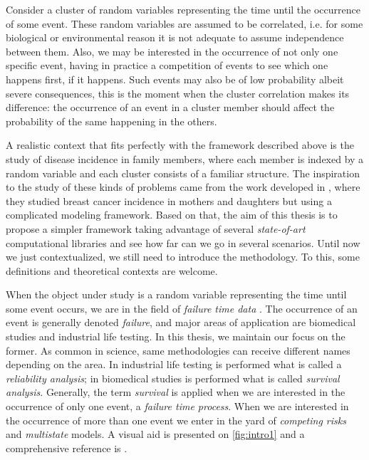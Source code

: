 Consider a cluster of random variables representing the time until the
occurrence of some event. These random variables are assumed to be
correlated, i.e. for some biological or environmental reason it is not
adequate to assume independence between them. Also, we may be interested
in the occurrence of not only one specific event, having in practice a
competition of events to see which one happens first, if it
happens. Such events may also be of low probability albeit severe
consequences, this is the moment when the cluster correlation makes its
difference: the occurrence of an event in a cluster member should affect
the probability of the same happening in the others.

A realistic context that fits perfectly with the framework described
above is the study of disease incidence in family members, where each
member is indexed by a random variable and each cluster consists of a
familiar structure. The inspiration to the study of these kinds of
problems came from the work developed in , where
they studied breast cancer incidence in mothers and daughters but using
a complicated modeling framework. Based on that, the aim of this thesis
is to propose a simpler framework taking advantage of
several \textit{state-of-art} computational libraries and see how far
can we go in several scenarios. Until now we just contextualized, we
still need to introduce the methodology. To this, some definitions and
theoretical contexts are welcome.

When the object under study is a random variable representing the time
until some event occurs, we are in the field of \textit{failure time
data} \cite{kalb&prentice}. The occurrence of an event is generally
denoted \textit{failure}, and major areas of application are biomedical
studies and industrial life testing. In this thesis, we maintain our
focus on the former. As common in science, same methodologies can
receive different names depending on the area. In industrial life
testing is performed what is called a \textit{reliability analysis}; in
biomedical studies is performed what is called
\textit{survival analysis}. Generally, the term \textit{survival} is
applied when we are interested in the occurrence of only one event, a
\textit{failure time process}. When we are interested in the occurrence
of more than one event we enter in the yard of \textit{competing risks}
and \textit{multistate} models. A visual aid is presented on
\autoref{fig:intro1} and a comprehensive reference is
.

